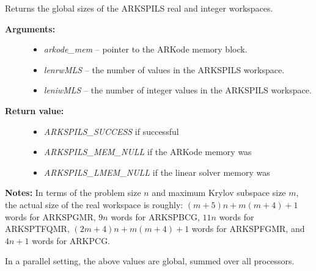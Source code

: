 \documentclass[letterpaper,10pt,english]{sphinxmanual}
\begin{document}
\begin{fulllineitems}
\label{c_interface/User_callable:c.ARKSpilsGetMassWorkSpace}
Returns the global sizes of the ARKSPILS real and integer workspaces.
\begin{description}
\item[{\textbf{Arguments:}}] \leavevmode\begin{itemize}
\item {} 
\emph{arkode\_mem} -- pointer to the ARKode memory block.

\item {} 
\emph{lenrwMLS} -- the number of  values in the ARKSPILS workspace.

\item {} 
\emph{leniwMLS} -- the number of integer values in the ARKSPILS workspace.

\end{itemize}

\item[{\textbf{Return value:}}] \leavevmode\begin{itemize}
\item {} 
\emph{ARKSPILS\_SUCCESS} if successful

\item {} 
\emph{ARKSPILS\_MEM\_NULL} if the ARKode memory was 

\item {} 
\emph{ARKSPILS\_LMEM\_NULL} if the linear solver memory was 

\end{itemize}

\end{description}

\textbf{Notes:} In terms of the problem size \(n\) and maximum Krylov subspace
size \(m\), the actual size of the real workspace is roughly:
\((m+5)n+m(m+4)+1\)  words for ARKSPGMR,
\(9n\)  words for ARKSPBCG, \(11n\)
 words for ARKSPTFQMR, \((2m+4)n+m(m+4)+1\)
 words for ARKSPFGMR, and \(4n+1\)
 words for ARKPCG.

In a parallel setting, the above values are global, summed over all
processors.

\end{fulllineitems}

\end{document}
